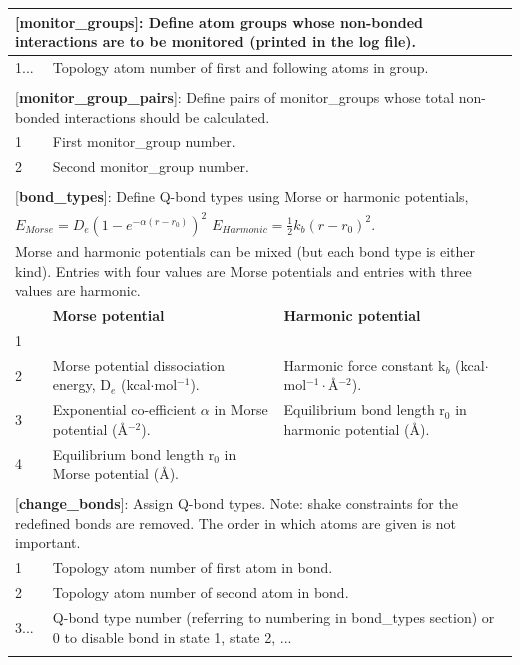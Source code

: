 \documentclass[10pt,oneside,pdftex]{article}
\begin{document}
\begin{longtable}{|p{53pt}|p{181pt}|p{160pt}|}
\multicolumn{3}{p{394pt}}{[\textbf{monitor\_groups}]: Define atom groups whose non-bonded interactions are to be monitored (printed in the log file).}\\
\hline 1... & \multicolumn{2}{p{341pt}|}{Topology atom number of first and following atoms in group.}\\
\hline
\multicolumn{3}{p{394pt}}{}\\

\multicolumn{3}{p{394pt}}{[\textbf{monitor\_group\_pairs}]: Define pairs of monitor\_groups whose total non-bonded interactions should be calculated.}\\
\hline 1 & \multicolumn{2}{p{341pt}|}{First monitor\_group number.}\\
\hline 2 & \multicolumn{2}{p{341pt}|}{Second monitor\_group number.}\\
\hline
\multicolumn{3}{p{394pt}}{}\\

\multicolumn{3}{p{394pt}}{[\textbf{bond\_types}]: Define Q-bond types using Morse or harmonic potentials,}\\
\multicolumn{3}{p{394pt}}{$E_{Morse}=D_e \left(1-e^{-\alpha\left(r-r_0\right)}\right)^2$   $E_{Harmonic}=\frac{1}{2}k_b\left(r-r_0\right)^2$.}\\
\multicolumn{3}{p{394pt}}{Morse and harmonic potentials can be mixed (but each bond type is either kind). Entries with four values are Morse potentials and entries with three values are harmonic.}\\
\hline & \textbf{Morse potential} & \textbf{Harmonic potential}\\
\hline 1 & \multicolumn{2}{p{341pt}|}{\centering{Q-bond type number (starting with 1).}}\\
\hline 2 & Morse potential dissociation energy, D$_e$ (kcal$\cdot$mol$^{-1}$). &  Harmonic force constant k$_b$ (kcal$\cdot$mol$^{-1}\cdot${\AA}$^{-2}$).\\
\hline 3 & Exponential co-efficient $\alpha$ in Morse potential ({\AA}$^{-2}$). & Equilibrium bond length r$_0$ in harmonic potential ({\AA}).\\
\hline 4 & Equilibrium bond length r$_0$ in Morse potential ({\AA}).&\\
\hline
\multicolumn{3}{p{394pt}}{}\\

\multicolumn{3}{p{394pt}}{[\textbf{change\_bonds}]: Assign Q-bond types. Note: shake constraints for the redefined bonds are removed. The order in which atoms are given is not important.}\\
\hline 1 & \multicolumn{2}{p{341pt}|}{Topology atom number of first atom in bond.}\\
\hline 2 & \multicolumn{2}{p{341pt}|}{Topology atom number of second atom in bond.}\\
\hline 3... & \multicolumn{2}{p{341pt}|}{Q-bond type number (referring to numbering in bond\_types section) or 0 to disable bond in state 1, state 2, ...}\\
\hline
\multicolumn{3}{p{394pt}}{}\\


\end{longtable}
\end{document}
